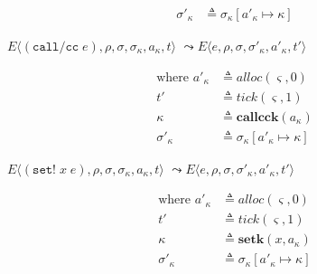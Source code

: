 \documentclass[12pt,draft]{article}
\newcommand{\callccsyn}[1]{(\texttt{call/cc}\;#1)}
\newcommand{\setsyn}[2]{(\texttt{set!}\;#1\;#2)}
\begin{document}
\begin{multicols*}{2}
\begin{align*}
  \sigma'_\kappa &\triangleq \sigma_\kappa[a'_\kappa \mapsto \kappa]
\end{align*}
\begin{center}
  $E\langle \callccsyn{e} , \rho , \sigma , \sigma_\kappa , a_\kappa , t \rangle$
  $\leadsto E\langle e , \rho , \sigma , \sigma'_\kappa , a'_\kappa , t' \rangle$
\end{center}
\vspace{-5mm}
\begin{align*}
  \text{where }
  a'_\kappa &\triangleq alloc(\varsigma, 0) \\
  t' &\triangleq tick(\varsigma, 1) \\
  \kappa &\triangleq \textbf{callcck}(a_\kappa) \\
  \sigma'_\kappa &\triangleq \sigma_\kappa[a'_\kappa \mapsto \kappa]
\end{align*}
\begin{center}
  $E\langle \setsyn{x}{e} , \rho , \sigma , \sigma_\kappa , a_\kappa , t \rangle$
  $\leadsto E\langle e , \rho , \sigma , \sigma'_\kappa , a'_\kappa , t' \rangle$
\end{center}
\vspace{-5mm}
\begin{align*}
  \text{where }
  a'_\kappa &\triangleq alloc(\varsigma, 0) \\
  t' &\triangleq tick(\varsigma, 1) \\
  \kappa &\triangleq \textbf{setk}(x, a_\kappa) \\
  \sigma'_\kappa &\triangleq \sigma_\kappa[a'_\kappa \mapsto \kappa]
\end{align*}


\vfill\null
\columnbreak


\end{multicols*}
\end{document}
